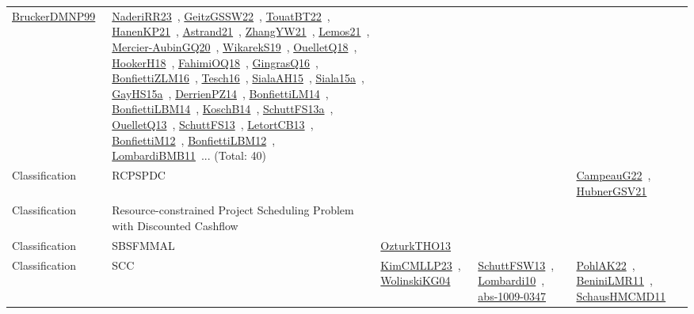 {\begin{longtable}{lp{3cm}>{\raggedright\arraybackslash}p{6cm}>{\raggedright\arraybackslash}p{6cm}>{\raggedright\arraybackslash}p{8cm}}
\href{works/BruckerDMNP99.pdf}{BruckerDMNP99}~\cite{BruckerDMNP99} & \href{works/NaderiRR23.pdf}{NaderiRR23}~\cite{NaderiRR23}, \href{works/GeitzGSSW22.pdf}{GeitzGSSW22}~\cite{GeitzGSSW22}, \href{works/TouatBT22.pdf}{TouatBT22}~\cite{TouatBT22}, \href{works/HanenKP21.pdf}{HanenKP21}~\cite{HanenKP21}, \href{works/Astrand21.pdf}{Astrand21}~\cite{Astrand21}, \href{works/ZhangYW21.pdf}{ZhangYW21}~\cite{ZhangYW21}, \href{works/Lemos21.pdf}{Lemos21}~\cite{Lemos21}, \href{works/Mercier-AubinGQ20.pdf}{Mercier-AubinGQ20}~\cite{Mercier-AubinGQ20}, \href{works/WikarekS19.pdf}{WikarekS19}~\cite{WikarekS19}, \href{works/OuelletQ18.pdf}{OuelletQ18}~\cite{OuelletQ18}, \href{works/HookerH18.pdf}{HookerH18}~\cite{HookerH18}, \href{works/FahimiOQ18.pdf}{FahimiOQ18}~\cite{FahimiOQ18}, \href{works/GingrasQ16.pdf}{GingrasQ16}~\cite{GingrasQ16}, \href{works/BonfiettiZLM16.pdf}{BonfiettiZLM16}~\cite{BonfiettiZLM16}, \href{works/Tesch16.pdf}{Tesch16}~\cite{Tesch16}, \href{works/SialaAH15.pdf}{SialaAH15}~\cite{SialaAH15}, \href{works/Siala15a.pdf}{Siala15a}~\cite{Siala15a}, \href{works/GayHS15a.pdf}{GayHS15a}~\cite{GayHS15a}, \href{works/DerrienPZ14.pdf}{DerrienPZ14}~\cite{DerrienPZ14}, \href{works/BonfiettiLM14.pdf}{BonfiettiLM14}~\cite{BonfiettiLM14}, \href{works/BonfiettiLBM14.pdf}{BonfiettiLBM14}~\cite{BonfiettiLBM14}, \href{works/KoschB14.pdf}{KoschB14}~\cite{KoschB14}, \href{works/SchuttFS13a.pdf}{SchuttFS13a}~\cite{SchuttFS13a}, \href{works/OuelletQ13.pdf}{OuelletQ13}~\cite{OuelletQ13}, \href{works/SchuttFS13.pdf}{SchuttFS13}~\cite{SchuttFS13}, \href{works/LetortCB13.pdf}{LetortCB13}~\cite{LetortCB13}, \href{works/BonfiettiM12.pdf}{BonfiettiM12}~\cite{BonfiettiM12}, \href{works/BonfiettiLBM12.pdf}{BonfiettiLBM12}~\cite{BonfiettiLBM12}, \href{works/LombardiBMB11.pdf}{LombardiBMB11}~\cite{LombardiBMB11}... (Total: 40)\\
Classification & RCPSPDC &  &  & \href{works/CampeauG22.pdf}{CampeauG22}~\cite{CampeauG22}, \href{works/HubnerGSV21.pdf}{HubnerGSV21}~\cite{HubnerGSV21}\\
Classification & Resource-constrained Project Scheduling Problem with Discounted Cashflow &  &  & \\
Classification & SBSFMMAL & \href{works/OzturkTHO13.pdf}{OzturkTHO13}~\cite{OzturkTHO13} &  & \\
Classification & SCC & \href{works/KimCMLLP23.pdf}{KimCMLLP23}~\cite{KimCMLLP23}, \href{works/WolinskiKG04.pdf}{WolinskiKG04}~\cite{WolinskiKG04} & \href{works/SchuttFSW13.pdf}{SchuttFSW13}~\cite{SchuttFSW13}, \href{works/Lombardi10.pdf}{Lombardi10}~\cite{Lombardi10}, \href{works/abs-1009-0347.pdf}{abs-1009-0347}~\cite{abs-1009-0347} & \href{works/PohlAK22.pdf}{PohlAK22}~\cite{PohlAK22}, \href{works/BeniniLMR11.pdf}{BeniniLMR11}~\cite{BeniniLMR11}, \href{works/SchausHMCMD11.pdf}{SchausHMCMD11}~\cite{SchausHMCMD11}\\

\end{longtable}}
